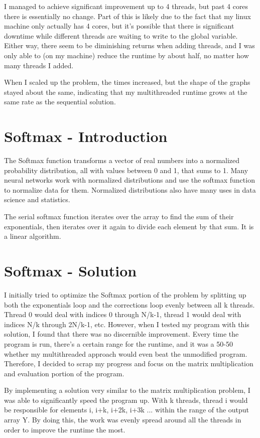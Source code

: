 \documentclass[a4paper]{article}
\begin{document}
I managed to achieve significant improvement up to 4 threads, but past 4 cores there is essentially no change. Part of this is likely due to the fact that my linux machine only actually has 4 cores, but it's possible that there is significant downtime while different threads are waiting to write to the global variable. Either way, there seem to be diminishing returns when adding threads, and I was only able to (on my machine) reduce the runtime by about half, no matter how many threads I added.

When I scaled up the problem, the times increased, but the shape of the graphs stayed about the same, indicating that my multithreaded runtime grows at the same rate as the sequential solution.

\section{Softmax - Introduction}

The Softmax function transforms a vector of real numbers into a normalized probability distribution, all with values between 0 and 1, that sums to 1. Many neural networks work with normalized distributions and use the softmax function to normalize data for them. Normalized distributions also have many uses in data science and statistics.

The serial softmax function iterates over the array to find the sum of their exponentials, then iterates over it again to divide each element by that sum. It is a linear algorithm.


\section{Softmax - Solution}

I initially tried to optimize the Softmax portion of the problem by splitting up both the exponentials loop and the corrections loop evenly between all k threads. Thread 0 would deal with indices 0 through N/k-1, thread 1 would deal with indices N/k through 2N/k-1, etc. However, when I tested my program with this solution, I found that there was no discernible improvement. Every time the program is run, there's a certain range for the runtime, and it was a 50-50 whether my multithreaded approach would even beat the unmodified program. Therefore, I decided to scrap my progress and focus on the matrix multiplication and evaluation portion of the program.

By implementing a solution very similar to the matrix multiplication problem, I was able to significantly speed the program up. With k threads, thread i would be responsible for elements i, i+k, i+2k, i+3k ... within the range of the output array Y. By doing this, the work was evenly spread around all the threads in order to improve the runtime the most.
\end{document}
